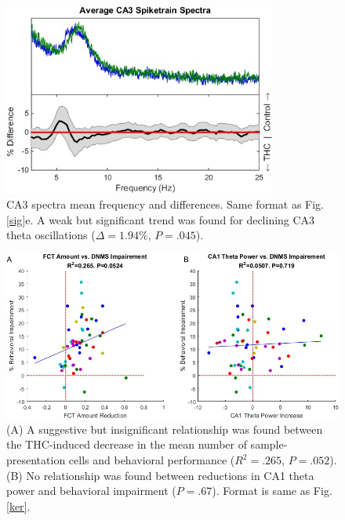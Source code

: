 \documentclass[11pt,a4paper,final]{article}
\begin{document}
\begin{figure}[!ht]
\centering
\includegraphics[width=90mm]{SFca3spectra}
\caption[CA3 Frequency Spectra]{
CA3 spectra mean frequency and differences. Same format as Fig. \ref{sig}e. A weak but significant trend was found for declining CA3 theta oscillations ($\Delta=1.94\%$, $P=.045$).}
\label{SFca3spectra}
\end{figure}

\begin{figure}[!ht]
\centering
\includegraphics[width=120mm]{SFnegsig}
\caption[Negative CA1 Theta Power Results]{
(A) A suggestive but insignificant relationship was found between the THC-induced decrease in the mean number of sample-presentation cells and behavioral performance ($R^2=.265$, $P=.052$).
(B) No relationship was found between reductions in CA1 theta power and behavioral impairment ($P=.67$).
Format is same as Fig. \ref{ker}.}
\label{SFnegsig}
\end{figure}
\end{document}
